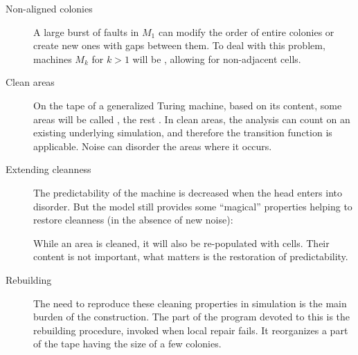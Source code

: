 \documentclass[11pt]{memoir}
\theoremstyle{definition} %
\begin{document}
\begin{description}

\item[Non-aligned colonies] A large burst of faults in \( M_{1} \) can modify the order of
entire colonies or create new ones with gaps between them.
To deal with this problem, machines \( M_{k} \) for \( k>1 \)
will be , allowing for non-adjacent cells.

\item[Clean areas]
  On the tape of a generalized Turing machine, based on its content, some areas will 
  be called , the rest .
  In clean areas, the analysis can count on an existing underlying simulation,
  and therefore the transition function is applicable.
  Noise can disorder the areas where it occurs.

\item[Extending cleanness]
  The predictability of the machine is decreased when the head enters into disorder.
  But the model still provides some ``magical'' properties
  helping to restore cleanness (in the absence of new noise):
While an area is cleaned, it will also be re-populated with cells.
Their content is not important, what matters is the restoration of predictability.

\item[Rebuilding]
The need to reproduce these cleaning properties in simulation is the
main burden of the construction.
The part of the program devoted to this is the rebuilding procedure,
invoked when local repair fails.
  It reorganizes a part of the tape having the size of a few colonies.
\end{description}


\end{document}
